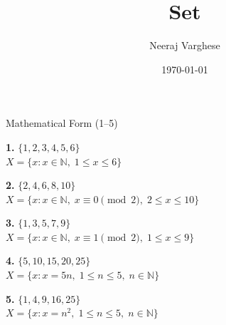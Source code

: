 \documentclass{beamer}
\title{Set}
\author{Neeraj Varghese}
\date{\today}
\begin{document}
\begin{frame}
    \titlepage
\end{frame}


\begin{frame}{Mathematical Form (1--5)}
\footnotesize

\textbf{1.} $\{1,2,3,4,5,6\}$\\
$X=\{x:x\in\mathbb N,\;1\le x\le6\}$

\vspace{0.1cm}

\textbf{2.} $\{2,4,6,8,10\}$\\
$X=\{x:x\in\mathbb N,\;x\equiv0\pmod2,\;2\le x\le10\}$

\vspace{0.1cm}

\textbf{3.} $\{1,3,5,7,9\}$\\
$X=\{x:x\in\mathbb N,\;x\equiv1\pmod2,\;1\le x\le9\}$

\vspace{0.1cm}

\textbf{4.} $\{5,10,15,20,25\}$\\
$X=\{x:x=5n,\;1\le n\le5,\;n\in\mathbb N\}$

\vspace{0.1cm}

\textbf{5.} $\{1,4,9,16,25\}$\\
$X=\{x:x=n^2,\;1\le n\le5,\;n\in\mathbb N\}$

\end{frame}
\end{document}
